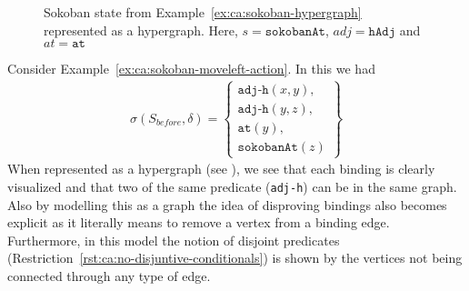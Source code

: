 \documentclass[../Master.tex]{subfiles}
\begin{document}
%
%

\begin{figure}
    \centering
        
        \caption{Sokoban state from Example~\ref{ex:ca:sokoban-hypergraph} represented as a hypergraph. Here, $s = \texttt{sokobanAt}$, $adj = \texttt{hAdj}$ and $at = \texttt{at}$}\label{fig:ca:sokoban-hypergraph}
\end{figure}

\begin{example}\label{ex:ca:sokoban-hypergraph}
	Consider Example~\ref{ex:ca:sokoban-moveleft-action}. In this we had
	\begin{align*}
		\sigma(S_{before}, \delta) =
			\left\{
			\begin{gathered}
				\texttt{adj-h}(x, y), \\
				\texttt{adj-h}(y, z), \\
				\texttt{at}(y), \\
				\texttt{sokobanAt}(z)
			\end{gathered}
			\right\}
	\end{align*}
	When represented as a hypergraph (see ),
	we see that each binding is clearly visualized and that two of the same predicate (\texttt{adj-h}) can be in the same graph.
	Also by modelling this as a graph the idea of disproving bindings also
	becomes explicit as it literally means to remove a vertex from a binding edge.
	Furthermore, in this model the notion of disjoint predicates (Restriction~\ref{rst:ca:no-disjuntive-conditionals}) is shown by the vertices not being connected through any type of edge.
\end{example}
\end{document}
